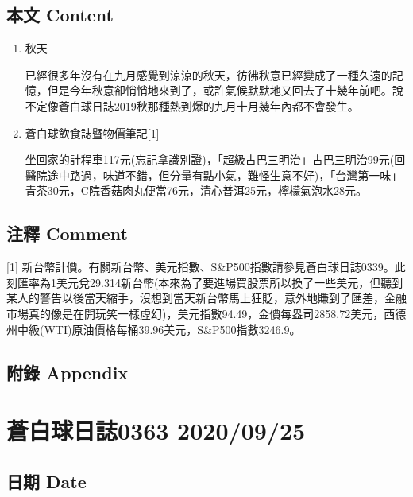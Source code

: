 \documentclass[
]{article}
\begin{document}
\hypertarget{ux672cux6587-content-23}{%
\subsection{本文 Content}\label{ux672cux6587-content-23}}

\begin{enumerate}
\def\labelenumi{\arabic{enumi}.}
\item
  秋天

  已經很多年沒有在九月感覺到涼涼的秋天，彷彿秋意已經變成了一種久遠的記憶，但是今年秋意卻悄悄地來到了，或許氣候默默地又回去了十幾年前吧。說不定像蒼白球日誌2019秋那種熱到爆的九月十月幾年內都不會發生。
\item
  蒼白球飲食誌暨物價筆記{[}1{]}

  坐回家的計程車117元(忘記拿識別證)，「超級古巴三明治」古巴三明治99元(回醫院途中路過，味道不錯，但分量有點小氣，難怪生意不好)，「台灣第一味」青茶30元，C院香菇肉丸便當76元，清心普洱25元，檸檬氣泡水28元。
\end{enumerate}

\hypertarget{ux6ce8ux91cb-comment-23}{%
\subsection{注釋 Comment}\label{ux6ce8ux91cb-comment-23}}

{[}1{]}
新台幣計價。有關新台幣、美元指數、S\&P500指數請參見蒼白球日誌0339。此刻匯率為1美元兌29.314新台幣(本來為了要進場買股票所以換了一些美元，但聽到某人的警告以後當天縮手，沒想到當天新台幣馬上狂貶，意外地賺到了匯差，金融市場真的像是在開玩笑一樣虛幻)，美元指數94.49，金價每盎司2858.72美元，西德州中級(WTI)原油價格每桶39.96美元，S\&P500指數3246.9。

\hypertarget{ux9644ux9304-appendix-23}{%
\subsection{附錄 Appendix}\label{ux9644ux9304-appendix-23}}

\hypertarget{ux84bcux767dux7403ux65e5ux8a8c0363-20200925}{%
\section{蒼白球日誌0363
2020/09/25}\label{ux84bcux767dux7403ux65e5ux8a8c0363-20200925}}

\hypertarget{ux65e5ux671f-date-24}{%
\subsection{日期 Date}\label{ux65e5ux671f-date-24}}
\end{document}
